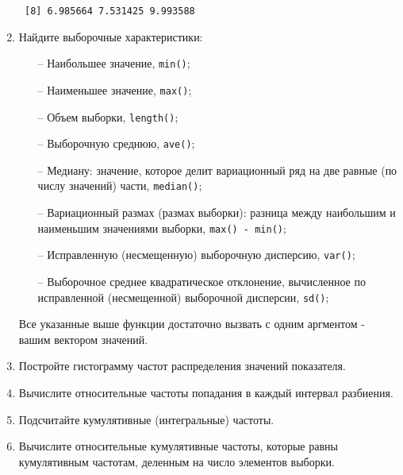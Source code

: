 \begin{enumerate}
		\indent \texttt{ [8]  6.985664  7.531425  9.993588}
	\item Найдите выборочные характеристики:
		\begin{itemize}
			\item[--] Наибольшее значение, \texttt{min()};
			\item[--] Наименьшее значение, \texttt{max()};
			\item[--] Объем выборки, \texttt{length()};
			\item[--] Выборочную среднюю, \texttt{ave()};
			\item[--] Медиану: значение, которое делит вариационный ряд на две равные (по числу значений) части, \texttt{median()};
			\item[--] Вариационный размах (размах выборки): разница между наибольшим и наименьшим значениями выборки, \texttt{max() - min()}; 
			\item[--] Исправленную (несмещенную) выборочную дисперсию, \texttt{var()};
			\item[--] Выборочное среднее квадратическое отклонение, вычисленное по исправленной (несмещенной) выборочной дисперсии, \texttt{sd()};
		\end{itemize}
		Все указанные выше функции достаточно вызвать с одним аргментом - вашим вектором значений.
	\item Постройте гистограмму частот распределения значений показателя.
	\item Вычислите относительные частоты попадания в каждый интервал разбиения.
	\item Подсчитайте кумулятивные (интегральные) частоты.
	\item Вычислите относительные кумулятивные частоты, которые равны кумулятивным частотам, деленным на число элементов выборки.

\end{enumerate}
